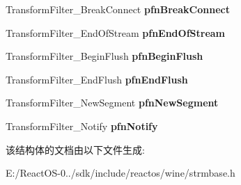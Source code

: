 \begin{DoxyCompactItemize}
\item 
\mbox{\label{struct_transform_filter_func_table_a780ddbb9a5aa4ffe7b88bd4c7a1a6eb2}} 
Transform\+Filter\+\_\+\+Break\+Connect {\bfseries pfn\+Break\+Connect}
\item 
\mbox{\label{struct_transform_filter_func_table_acb04c81fb3b8cac76c6fea15779d8ce8}} 
Transform\+Filter\+\_\+\+End\+Of\+Stream {\bfseries pfn\+End\+Of\+Stream}
\item 
\mbox{\label{struct_transform_filter_func_table_a1c1343ed546a4de8b51b9672577d011b}} 
Transform\+Filter\+\_\+\+Begin\+Flush {\bfseries pfn\+Begin\+Flush}
\item 
\mbox{\label{struct_transform_filter_func_table_a6bceee02a700e92e625548f555d6ba24}} 
Transform\+Filter\+\_\+\+End\+Flush {\bfseries pfn\+End\+Flush}
\item 
\mbox{\label{struct_transform_filter_func_table_a20cb3affd1d6beb38477f1e477c81279}} 
Transform\+Filter\+\_\+\+New\+Segment {\bfseries pfn\+New\+Segment}
\item 
\mbox{\label{struct_transform_filter_func_table_a1478dfe6c2815a12ac3c105b25b10001}} 
Transform\+Filter\+\_\+\+Notify {\bfseries pfn\+Notify}
\end{DoxyCompactItemize}


该结构体的文档由以下文件生成\+:\begin{DoxyCompactItemize}
\item 
E\+:/\+React\+O\+S-\/0../sdk/include/reactos/wine/strmbase.\+h\end{DoxyCompactItemize}
